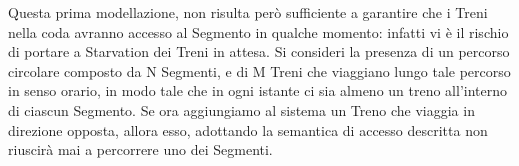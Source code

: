 \begin{description}
			Questa prima modellazione, non risulta però sufficiente a garantire che i Treni nella coda avranno accesso al Segmento in qualche momento: infatti vi è il rischio di portare a Starvation dei Treni in attesa. Si consideri la presenza di un percorso circolare composto da N Segmenti, e di M Treni che viaggiano lungo tale percorso in senso orario, in modo tale che in ogni istante ci sia almeno un treno all'interno di ciascun Segmento. Se ora aggiungiamo al sistema un Treno che viaggia in direzione opposta, allora esso, adottando la semantica di accesso descritta non riuscirà mai a percorrere uno dei Segmenti.			
			
			

\end{description}
